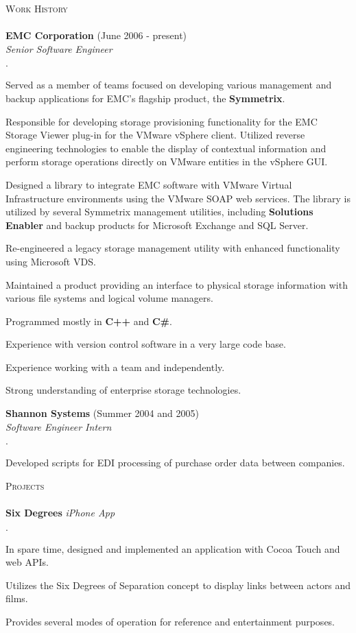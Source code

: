 \documentclass[11pt]{article}
\newcommand{\mydot}{$\cdot$ }
\newcommand{\lineunder}{\vspace*{-8pt} \\ \hspace*{-18pt} \hrulefill \\}
\newcommand{\header}[1]{{\hspace*{-15pt}\vspace*{6pt} \textsc{#1}} \vspace*{-6pt} \lineunder}
\newcommand{\employer}[3]{\textbf{#1} (#2)\\ \emph{#3}\\  }
\newcommand{\project}[2]{\textbf{#1} \emph{#2}\\  }
\newenvironment{achievements}{\begin{list}{\mydot}{\topsep 0pt \itemsep -2pt}}{\vspace*{4pt}\end{list}}
\begin{document}
\header{Work History}
\employer{EMC Corporation}{June 2006 - present}{Senior Software Engineer}
\begin{achievements}
  \item Served as a member of teams focused on developing various management and backup applications for EMC's flagship product, the \textbf{Symmetrix}.
  \item Responsible for developing storage provisioning functionality for the EMC Storage Viewer plug-in for the VMware vSphere client.  Utilized reverse engineering technologies to enable the display of contextual information and perform storage operations directly on VMware entities in the vSphere GUI.
  \item Designed a library to integrate EMC software with VMware Virtual Infrastructure environments using the VMware SOAP web services.  The library is utilized by several Symmetrix management utilities, including \textbf{Solutions Enabler} and backup products for Microsoft Exchange and SQL Server.
  \item Re-engineered a legacy storage management utility with enhanced functionality using Microsoft VDS.
  \item Maintained a product providing an interface to physical storage information with various file systems and logical volume managers.
  \item Programmed mostly in \textbf{C++} and \textbf{C\#}.
  \item Experience with version control software in a very large code base.
  \item Experience working with a team and independently.
  \item Strong understanding of enterprise storage technologies.
\end{achievements}

\employer{Shannon Systems}{Summer 2004 and 2005}{Software Engineer Intern}
\begin{achievements}
  \item Developed scripts for EDI processing of purchase order data between companies.
\end{achievements}


\header{Projects}
\project{Six Degrees}{iPhone App}{
\begin{achievements}
  \item In spare time, designed and implemented an application with Cocoa Touch and web APIs.
  \item Utilizes the Six Degrees of Separation concept to display links between actors and films.
  \item Provides several modes of operation for reference and entertainment purposes.
\end{achievements}}
\end{document}
